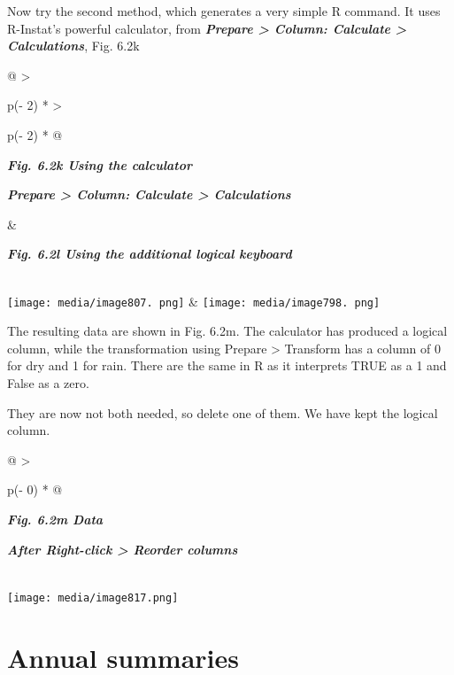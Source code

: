 \documentclass[
  letterpaper,
  DIV=11,
  numbers=noendperiod]{scrreprt}
\begin{document}
Now try the second method, which generates a very simple R command. It
uses R-Instat's powerful calculator, from \textbf{\emph{Prepare
\textgreater{} Column: Calculate \textgreater{} Calculations}}, Fig.
6.2k

\begin{longtable}[]{@{}
  >{\raggedright\arraybackslash}p{(\columnwidth - 2\tabcolsep) * }
  >{\raggedright\arraybackslash}p{(\columnwidth - 2\tabcolsep) * }@{}}
\toprule\noalign{}
\begin{minipage}[b]{\linewidth}\raggedright
\textbf{\emph{Fig. 6.2k Using the calculator}}

\textbf{\emph{Prepare \textgreater{} Column: Calculate \textgreater{}
Calculations}}
\end{minipage} & \begin{minipage}[b]{\linewidth}\raggedright
\textbf{\emph{Fig. 6.2l Using the additional logical keyboard}}
\end{minipage} \\
\midrule\noalign{}
\endhead
\bottomrule\noalign{}
\endlastfoot
\texttt{[image: media/image807. png]}
&
\texttt{[image: media/image798. png]} \\
\end{longtable}

The resulting data are shown in Fig. 6.2m. The calculator has produced a
logical column, while the transformation using Prepare \textgreater{}
Transform has a column of 0 for dry and 1 for rain. There are the same
in R as it interprets TRUE as a 1 and False as a zero.

They are now not both needed, so delete one of them. We have kept the
logical column.

\begin{longtable}[]{@{}
  >{\raggedright\arraybackslash}p{(\columnwidth - 0\tabcolsep) * }@{}}
\toprule\noalign{}
\begin{minipage}[b]{\linewidth}\raggedright
\textbf{\emph{Fig. 6.2m Data}}

\textbf{\emph{After Right-click \textgreater{} Reorder columns}}
\end{minipage} \\
\midrule\noalign{}
\endhead
\bottomrule\noalign{}
\endlastfoot
\texttt{[image: media/image817.png]} \\
\end{longtable}

\section{Annual summaries}\label{annual-summaries}
\end{document}
